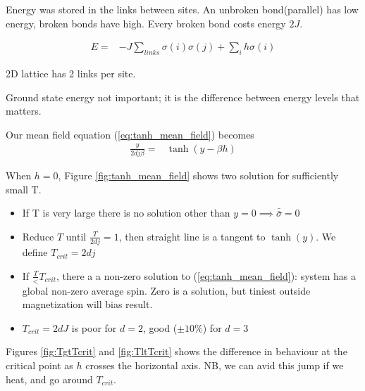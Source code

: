 \documentclass[]{article}
\begin{document}
Energy was stored in the links between sites. An unbroken bond(parallel) has low energy, broken bonds have high. Every broken bond costs energy $2J$.

\begin{align*}
E =& -J \sum_{links} \sigma(i) \sigma(j) + \sum_{i}h\sigma(i)
\end{align*}

2D lattice has 2 links per site.

Ground state energy not important; it is the difference between energy levels that matters.

Our mean field equation (\ref{eq:tanh_mean_field}) becomes
\begin{align*}
\frac{ y}{2 d j \beta} =& \tanh(y - \beta h)
\end{align*}

When $h=0$, Figure \ref{fig:tanh_mean_field} shows two solution for sufficiently small T.

\begin{itemize}
	\item If T is very large there is no solution other than $y=0\implies\bar{\bar{\sigma}}=0$
	\item Reduce $T$ until $\frac{T}{2 d j}= 1$, then straight line is a tangent to $\tanh(y)$. We define $T_{crit}= 2 d j$
	\item If $\frac{T}<T_{crit}$, there a a non-zero solution to (\ref{eq:tanh_mean_field}): system has a global non-zero average spin. Zero is a solution, but tiniest outside magnetization will bias result.
	\item $T_{crit} = 2 d J$ is poor for $d=2$, good ($\pm10\%$) for $d=3$
\end{itemize}

Figures \ref{fig:TgtTcrit} and \ref{fig:TltTcrit} shows the difference in behaviour at the critical point as $h$ crosses the horizontal axis. NB, we can avid this jump if we heat, and go around $T_{crit}$.
\end{document}
